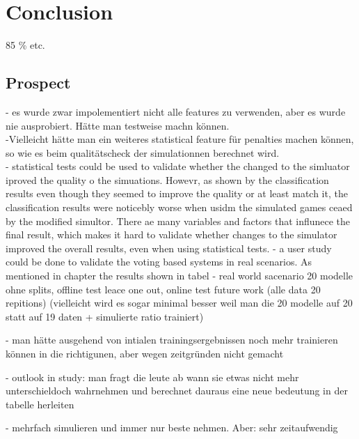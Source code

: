 \chapter{Conclusion}
85 \% etc.  

\section{Prospect}
- es wurde zwar impolementiert nicht alle features zu verwenden, aber es wurde nie ausprobiert. Hätte man testweise machn können. \\
-Vielleicht hätte man ein weiteres statistical feature für penalties machen können, so wie es beim qualitätscheck der simulationnen berechnet wird.\\
- statistical tests could be used to validate whether the changed to the simluator iproved the quality o the simuations. Howevr, as shown by the classification results even though they seemed to improve the quality or at least match it, the classification results were noticebly worse when usidm the simulated games ceaed by the modified simultor. There ae many variables and factors that influnece the final result, which makes it hard to validate whether changes to the simulator improved the overall results, even when using statistical tests. 
- a user study could be done to validate the voting based systems in real scenarios. As mentioned in chapter  the results shown in tabel  
- real world sacenario 20 modelle ohne splits, offline test leace one out, online test future work (alle data 20 repitions) (vielleicht wird es sogar minimal besser weil man die 20 modelle auf 20 statt auf 19 daten + simulierte ratio trainiert)

- man hätte ausgehend von intialen trainingsergebnissen noch mehr trainieren können in die richtigunen, aber wegen zeitgründen nicht gemacht 


- outlook in study: man fragt die leute ab wann sie etwas nicht 
mehr unterschieldoch wahrnehmen und berechnet dauraus eine neue bedeutung in der tabelle herleiten 

- mehrfach simulieren und immer nur beste nehmen. Aber: sehr zeitaufwendig
